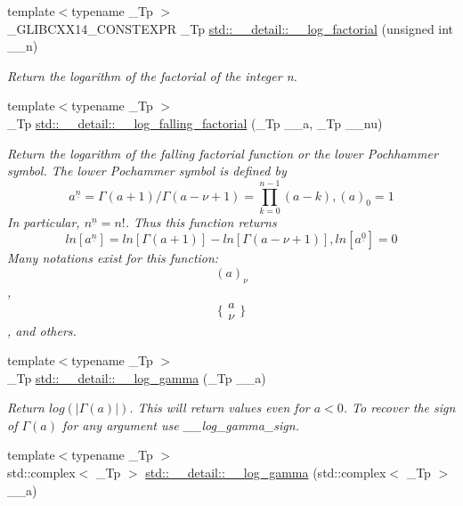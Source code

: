 \begin{DoxyCompactItemize}
{\footnotesize template$<$typename \+\_\+\+Tp $>$ }\\\+\_\+\+G\+L\+I\+B\+C\+X\+X14\+\_\+\+C\+O\+N\+S\+T\+E\+X\+PR \+\_\+\+Tp \hyperlink{namespacestd_1_1____detail_a2809419dbbe9fc60066dacfdc13761d4}{std\+::\+\_\+\+\_\+detail\+::\+\_\+\+\_\+log\+\_\+factorial} (unsigned int \+\_\+\+\_\+n)
\begin{DoxyCompactList}\small\item\em Return the logarithm of the factorial of the integer n. \end{DoxyCompactList}\item 
{\footnotesize template$<$typename \+\_\+\+Tp $>$ }\\\+\_\+\+Tp \hyperlink{namespacestd_1_1____detail_abc3aa91fde134d9f01be8fc8e7c7cc79}{std\+::\+\_\+\+\_\+detail\+::\+\_\+\+\_\+log\+\_\+falling\+\_\+factorial} (\+\_\+\+Tp \+\_\+\+\_\+a, \+\_\+\+Tp \+\_\+\+\_\+nu)
\begin{DoxyCompactList}\small\item\em Return the logarithm of the falling factorial function or the lower Pochhammer symbol. The lower Pochammer symbol is defined by \[ a^{\underline{n}} = \Gamma(a + 1) / \Gamma(a - \nu + 1) = \prod_{k=0}^{n-1} (a - k), (a)_0 = 1 \] In particular, $ n^{\underline{n}} = n! $. Thus this function returns \[ ln[a^{\underline{n}}] = ln[\Gamma(a + 1)] - ln[\Gamma(a - \nu + 1)], ln[a^{\underline{0}}] = 0 \] Many notations exist for this function\+: \[ (a)_\nu \], \[ \{ \begin{array}{c} a \\ \nu \end{array} \} \], and others. \end{DoxyCompactList}\item 
{\footnotesize template$<$typename \+\_\+\+Tp $>$ }\\\+\_\+\+Tp \hyperlink{namespacestd_1_1____detail_af6c4c0192a07f467fd9ddeebb28a34d4}{std\+::\+\_\+\+\_\+detail\+::\+\_\+\+\_\+log\+\_\+gamma} (\+\_\+\+Tp \+\_\+\+\_\+a)
\begin{DoxyCompactList}\small\item\em Return $ log(|\Gamma(a)|) $. This will return values even for $ a < 0 $. To recover the sign of $ \Gamma(a) $ for any argument use {\itshape \+\_\+\+\_\+log\+\_\+gamma\+\_\+sign}. \end{DoxyCompactList}\item 
{\footnotesize template$<$typename \+\_\+\+Tp $>$ }\\std\+::complex$<$ \+\_\+\+Tp $>$ \hyperlink{namespacestd_1_1____detail_ad37ad67a4b856eb97b13c8844f9ef8d8}{std\+::\+\_\+\+\_\+detail\+::\+\_\+\+\_\+log\+\_\+gamma} (std\+::complex$<$ \+\_\+\+Tp $>$ \+\_\+\+\_\+a)

\end{DoxyCompactItemize}
